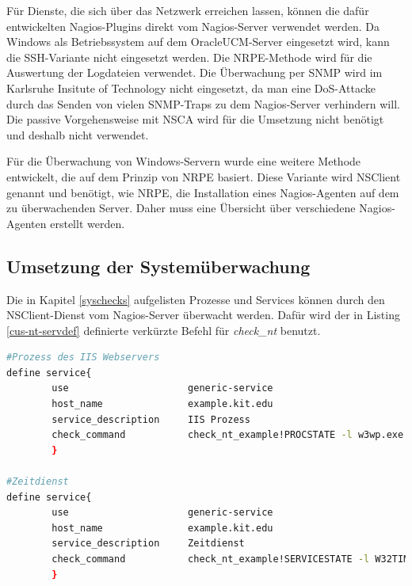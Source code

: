 Für Dienste, die sich über das Netzwerk erreichen lassen, können die dafür entwickelten Nagios-Plugins direkt vom Nagios-Server verwendet werden.
Da Windows als Betriebssystem auf dem \gls{OracleUCM}-Server eingesetzt wird, kann die \gls{SSH}-Variante nicht eingesetzt werden.
Die \gls{NRPE}-Methode wird für die Auswertung der Logdateien verwendet.
Die Überwachung per \gls{SNMP} wird im Karlsruhe Insitute of Technology nicht eingesetzt, da man eine \gls{DoS}-Attacke durch das Senden von vielen \gls{SNMP}-Traps zu dem Nagios-Server verhindern will.\label{snmpkom}
Die passive Vorgehensweise mit \gls{NSCA} wird für die Umsetzung nicht benötigt und deshalb nicht verwendet.

Für die Überwachung von Windows-Servern wurde eine weitere Methode entwickelt, die auf dem Prinzip von \gls{NRPE} basiert.
Diese Variante wird NSClient genannt und benötigt, wie \gls{NRPE}, die Installation eines Nagios-Agenten auf dem zu überwachenden Server.
Daher muss eine Übersicht über verschiedene Nagios-Agenten erstellt werden.



\subsection{Umsetzung der Systemüberwachung}

Die in Kapitel \ref{syschecks} aufgelisten Prozesse und Services können durch den NSClient-Dienst vom Nagios-Server überwacht werden.
Dafür wird der in Listing \ref{cus-nt-servdef} definierte verkürzte Befehl für \textit{check\_nt} benutzt.

\begin{lstlisting}[captionpos=b, caption=Prozess- und Service-Check Servicedefintionen, label=procservdef, breaklines = true, language=sh]
#Prozess des IIS Webservers
define service{
        use                     generic-service
        host_name               example.kit.edu
        service_description     IIS Prozess
        check_command           check_nt_example!PROCSTATE -l w3wp.exe
        }

#Zeitdienst
define service{
        use                     generic-service
        host_name               example.kit.edu
        service_description     Zeitdienst
        check_command           check_nt_example!SERVICESTATE -l W32TIME
        }
\end{lstlisting}


